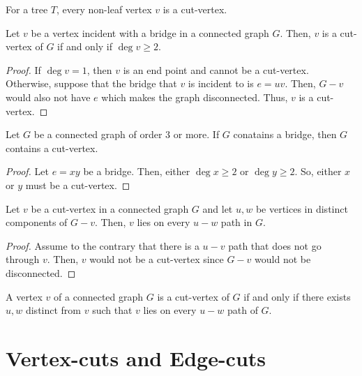 \begin{remark}
  For a tree \(T\), every non-leaf vertex \(v\) is a cut-vertex.
\end{remark}

\begin{theorem}
  Let \(v\) be a vertex incident with a bridge in a connected
  graph \(G\). Then, \(v\) is a cut-vertex of \(G\) if and only
  if \(\deg v \geq 2\).
\end{theorem}

\begin{proof}
  If \(\deg v = 1\), then \(v\) is an end point and cannot be a
  cut-vertex. Otherwise, suppose that the bridge that \(v\) is
  incident to is \(e=uv\). Then, \(G-v\) would also not have
  \(e\) which makes the graph disconnected. Thus, \(v\) is a
  cut-vertex.
\end{proof}

\begin{corollary}
  Let \(G\) be a connected graph of order 3 or more. If \(G\)
  conatains a bridge, then \(G\) contains a cut-vertex.
\end{corollary}

\begin{proof}
  Let \(e = xy\) be a bridge. Then, either \(\deg x \geq 2\) or
  \(\deg y \geq 2\). So, either \(x\) or \(y\) must be a
  cut-vertex.
\end{proof}

\begin{theorem}
  Let \(v\) be a cut-vertex in a connected graph \(G\) and let
  \(u, w\) be vertices in distinct components of \(G-v\). Then,
  \(v\) lies on every \(u-w\) path in \(G\).
\end{theorem}

\begin{proof}
  Assume to the contrary that there is a \(u-v\) path that does
  not go through \(v\). Then, \(v\) would not be a cut-vertex
  since \(G-v\) would not be disconnected.
\end{proof}

\begin{corollary}
  A vertex \(v\) of a connected graph \(G\) is a cut-vertex of
  \(G\) if and only if there exists \(u, w\) distinct from \(v\)
  such that \(v\) lies on every \(u-w\) path of \(G\).
\end{corollary}

\section{Vertex-cuts and Edge-cuts}

